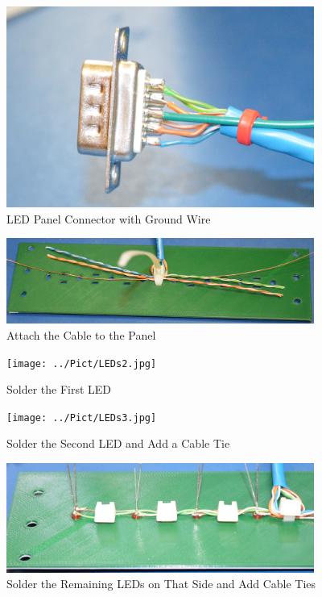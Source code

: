 \documentclass[10pt, openany]{book}
\begin{document}
\begin{figure}[ht!]
  \centering
  \includegraphics[width=0.9\textwidth]{../Pict/LEDs5.jpg}
  \caption{LED Panel Connector with Ground Wire}
  \label{fig:LED5}
\end{figure}

\begin{figure}[ht!]
  \centering
  \includegraphics[width=0.9\textwidth]{../Pict/LEDs1.jpg}
  \caption{Attach the Cable to the Panel}
  \label{fig:LED1}
\end{figure}

\begin{figure}[ht!]
  \centering
  \texttt{[image: ../Pict/LEDs2.jpg]}
  \caption{Solder the First LED}
  \label{fig:LED2}
\end{figure}

\begin{figure}[ht!]
  \centering
  \texttt{[image: ../Pict/LEDs3.jpg]}
  \caption{Solder the Second LED and Add a Cable Tie}
  \label{fig:LED3}
\end{figure}

\begin{figure}[ht!]
  \centering
  \includegraphics[width=0.9\textwidth]{../Pict/LEDs4.jpg}
  \caption{Solder the Remaining LEDs on That Side and Add Cable Ties}
  \label{fig:LED4}
\end{figure}
\end{document}
